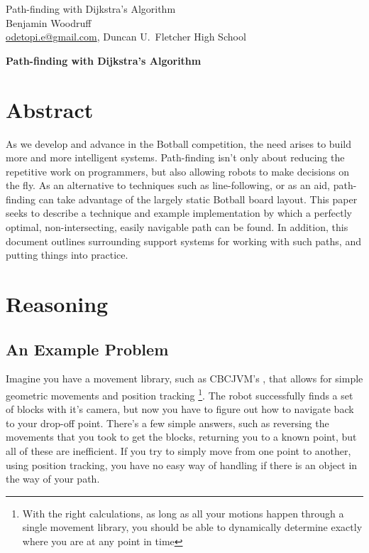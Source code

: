 \documentclass[letterpaper, 12pt]{article}
\begin{document}
\begin{flushleft}
Path-finding with Dijkstra's Algorithm\\
Benjamin Woodruff\\
\href{mailto:odetopi.e@gmail.com}{odetopi.e@gmail.com},
Duncan U.~Fletcher High School
\end{flushleft}

\vspace{0.25in}

\begin{huge}
    \begin{center}
        \textbf{Path-finding with Dijkstra's Algorithm}
    \end{center}
\end{huge}
\vspace{.5in}

\begin{multicols}{2}

\section{Abstract}

As we develop and advance in the Botball competition, the need arises to build
more and more intelligent systems. Path-finding isn't only about reducing the
repetitive work on programmers, but also allowing robots to make decisions on
the fly. As an alternative to techniques such as line-following, or as an aid,
path-finding can take advantage of the largely static Botball board layout. This
paper seeks to describe a technique and example implementation by which a
perfectly optimal, non-intersecting, easily navigable path can be found. In
addition, this document outlines surrounding support systems for working with
such paths, and putting things into practice.

\section{Reasoning}

\subsection{An Example Problem}

Imagine you have a movement library, such as CBCJVM's \cite{cbcjvm2010}, that
allows for simple geometric movements and position tracking \footnote{With the
right calculations, as long as all your motions happen through a single movement
library, you should be able to dynamically determine exactly where you are at
any point in time}. The robot successfully finds a set of blocks with it's
camera, but now you have to figure out how to navigate back to your drop-off
point. There's a few simple answers, such as reversing the movements that you
took to get the blocks, returning you to a known point, but all of these are
inefficient. If you try to simply move from one point to another, using position
tracking, you have no easy way of handling if there is an object in the way of
your path.


\end{multicols}
\end{document}
